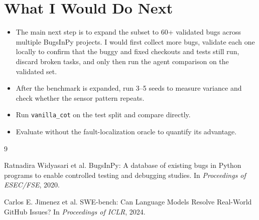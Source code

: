 \documentclass[11pt,a4paper]{article}
\begin{document}
\section{What I Would Do Next}

\begin{itemize}[nosep]
\item The main next step is to expand the subset to 60+ validated bugs across
  multiple BugsInPy projects. I would first collect more bugs, validate each
  one locally to confirm that the buggy and fixed checkouts and tests still run,
  discard broken tasks, and only then run the agent comparison on the validated
  set.
\item After the benchmark is expanded, run 3--5 seeds to measure variance and
  check whether the sensor pattern repeats.
\item Run \texttt{vanilla\_cot} on the test split and compare directly.
\item Evaluate without the fault-localization oracle to quantify its advantage.
\end{itemize}

\begin{thebibliography}{9}

Ratnadira Widyasari et al.
\newblock BugsInPy: A database of existing bugs in Python programs to enable
controlled testing and debugging studies.
\newblock In \emph{Proceedings of ESEC/FSE}, 2020.

Carlos E. Jimenez et al.
\newblock SWE-bench: Can Language Models Resolve Real-World GitHub Issues?
\newblock In \emph{Proceedings of ICLR}, 2024.

\end{thebibliography}
\end{document}
